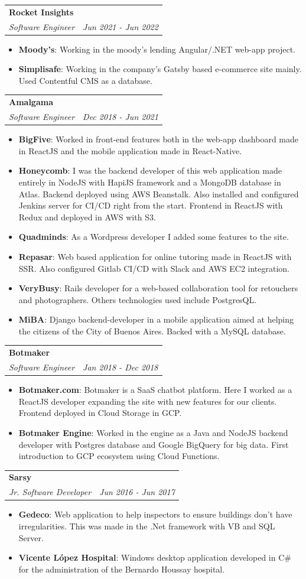 \documentclass[letterpaper,11pt]{article}
\makeatletter
\newcommand{\resumeItem}[2]{
  \item\small{
    \textbf{#1}{: #2 \vspace{-2pt}}
  }
}
\newcommand{\resumeSubheading}[4]{
  \vspace{-1pt}\item
    \begin{tabular*}{0.97\textwidth}[t]{l@{\extracolsep{\fill}}r}
      \textbf{#1} & #2 \\
      \textit{\small#3} & \textit{\small #4} \\
    \end{tabular*}\vspace{-5pt}
}
\newcommand{\resumeItemListStart}{\begin{itemize}}
\newcommand{\resumeItemListEnd}{\end{itemize}\vspace{-5pt}}
\makeatother
\begin{document}
    \resumeSubheading
      {Rocket Insights}{}
      {Software Engineer}{Jun 2021 - Jun 2022}
      \resumeItemListStart
        \resumeItem{Moody's}
          {Working in the moody's lending Angular/.NET web-app project.}
        \resumeItem{Simplisafe}
          {Working in the company's Gatsby based e-commerce site mainly. Used Contentful CMS as a database.}
      \resumeItemListEnd

    \resumeSubheading
      {Amalgama}{}
      {Software Engineer}{Dec 2018 - Jun 2021}
      \resumeItemListStart
        \resumeItem{BigFive}
          {Worked in front-end features both in the web-app dashboard made in ReactJS and the mobile application made in React-Native.}
        \resumeItem{Honeycomb}
          {I was the backend developer of this web application made entirely in NodeJS with HapiJS framework and a MongoDB database in Atlas. Backend deployed using AWS Beanstalk. Also installed and configured Jenkins server for CI/CD right from the start. Frontend in ReactJS with Redux and deployed in AWS with S3.}
	      \resumeItem{Quadminds}
          {As a Wordpress developer I added some features to the site.}
	      \resumeItem{Repasar}
          {Web based application for online tutoring made in ReactJS with SSR. Also configured Gitlab CI/CD with Slack and AWS EC2 integration.}
	      \resumeItem{VeryBusy}
          {Rails developer for a web-based collaboration tool for retouchers and photographers. Others technologies used include PostgresQL.}
	      \resumeItem{MiBA}
          {Django backend-developer in a mobile application aimed at helping the citizens of the City of Buenos Aires. Backed with a MySQL database.}
      \resumeItemListEnd

  \resumeSubheading
      {Botmaker}{}
      {Software Engineer}{Jan 2018 - Dec 2018}
      \resumeItemListStart
        \resumeItem{Botmaker.com}
          {Botmaker is a SaaS chatbot platform. Here I worked as a ReactJS developer expanding the site with new features for our clients. Frontend deployed in Cloud Storage in GCP.}
        \resumeItem{Botmaker Engine}
          {Worked in the engine as a Java and NodeJS backend developer with Postgres database and Google BigQuery for big data. First introduction to GCP ecosystem using Cloud Functions.}
      \resumeItemListEnd

  \resumeSubheading
      {Sarsy}{}
      {Jr. Software Developer}{Jun 2016 - Jun 2017}
      \resumeItemListStart
        \resumeItem{Gedeco}
          {Web application to help inspectors to ensure buildings don\/'t have irregularities. This was made in the .Net framework with VB and SQL Server.}
        \resumeItem{Vicente L\'opez Hospital}
          {Windows desktop application developed in C\# for the administration of the Bernardo Houssay hospital.}
      \resumeItemListEnd
      
\end{document}
